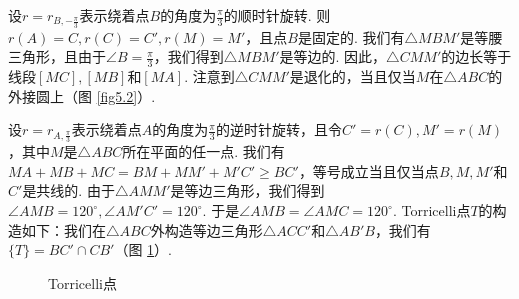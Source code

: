 \begin{solution}
  设$r=r_{B,-\frac\pi3}$表示绕着点$B$的角度为$\frac\pi3$的顺时针旋转. 则$r(A)=C,r(C)=C',r(M)=M'$，且点$B$是固定的. 我们有$\triangle MBM'$是等腰三角形，且由于$\angle  B=\frac\pi3$，我们得到$\triangle MBM'$是等边的. 因此，$\triangle CMM'$的边长等于线段$[MC],[MB]$和$[MA]$. 注意到$\triangle CMM'$是退化的，当且仅当$M$在$\triangle ABC$的外接圆上（图 \ref{fig5.2}）.
\end{solution}

\begin{solution}
  设$r=r_{A,\frac\pi3}$表示绕着点$A$的角度为$\frac\pi3$的逆时针旋转，且令$C'=r(C),M'=r(M)$，其中$M$是$\triangle ABC$所在平面的任一点. 我们有$MA+MB+MC=BM+MM'+M'C'\ge BC'$，等号成立当且仅当点$B,M,M'$和$C'$是共线的. 由于$\triangle AMM'$是等边三角形，我们得到$\angle AMB=120^\circ,\angle AM'C'=120^\circ$.
  于是$\angle AMB=\angle AMC=120^\circ$. Torricelli点$T$的构造如下：我们在$\triangle ABC$外构造等边三角形$\triangle ACC'$和$\triangle AB'B$，我们有$\{T\}=BC'\cap CB'$（图 \ref{fig5.3}）.
\end{solution}

\begin{figure}[!ht]
  \centering
  \caption{Torricelli点}\label{fig5.3}
  
\end{figure}

